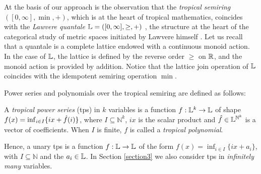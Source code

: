 %



At the basis of our approach is the observation that the \emph{tropical semiring} $([0,\infty], \min, +)$, which is at the heart of tropical mathematics, coincides with the \emph{Lawvere quantale} $\mathbb{L}=([0,\infty], \geq, +)$ \cite{Hofmann2014, Stubbe2014}, the structure at the heart of the categorical study of metric spaces initiated by Lawvere himself \cite{Lawvere1973}.
Let us recall that a quantale is a complete lattice endowed with a continuous monoid action.
In the case of $\mathbb{L}$, the lattice is defined by the reverse order $\geq$ on $\mathbb{R}$, and the monoid action is provided by addition. Notice that the lattice join operation of $\mathbb{L}$ coincides with the idempotent semiring operation $\min$. 




Power series and polynomials over the tropical semiring are defined as follows:


\begin{definition}
A \emph{tropical power series} (tps) 
in $k$ variables is a function $f:\mathbb{L}^k\to\mathbb{L}$ of shape $f(x)=\inf_{i\in I}\{ix + \hat{f}(i) \}$, where 
$I\subseteq\mathbb N^{k}$, $i x$ is the scalar product and $\hat{f}\in \mathbb{L}^{{\mathbb N}^{k}}$ is a vector of coefficients.
When $I$ is finite, $f$ is called a \emph{tropical polynomial}. 
\end{definition}
Hence, a unary tps is a function $f:\mathbb{L}\to \mathbb{L}$ of the form $f(x)=\inf_{i\in I}\{ix+a_{i}\}$, with $I\subseteq\mathbb N$ and the $a_{i}\in \mathbb{L}$.
In Section \ref{section3} we also consider tps in \emph{infinitely many} variables.

